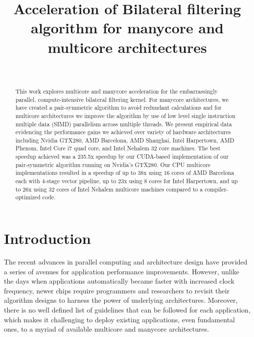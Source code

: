 \documentclass{IEEEtran}
\begin{document}
\title{Acceleration of Bilateral filtering algorithm for manycore and multicore architectures}
\author{\\
}
\maketitle
\begin{abstract}
This work explores multicore and manycore acceleration for the embarrassingly parallel, compute-intensive bilateral filtering kernel. For manycore architectures, we have created a pair-symmetric algorithm to avoid redundant calculations and for multicore architectures we improve the algorithm by use of low level single instruction multiple data (SIMD) parallelism across multiple threads. We present empirical data evidencing the performance gains we achieved over variety of hardware architectures including Nvidia GTX280, AMD Barcelona, AMD Shanghai, Intel Harpertown, AMD Phenom, Intel Core i7 quad core, and Intel Nehalem 32 core machines. The best speedup achieved was a 235.5x speedup by our CUDA-based implementation of our pair-symmetric algorithm running on Nvidia's GTX280. Our CPU multicore implementations resulted in a speedup of up to 38x using 16 cores of AMD Barcelona each with 4-stage vector pipeline, up to 23x using 8 cores for Intel Harpertown, and up to 26x using 32 cores of Intel Nehalem multicore machines compared to a compiler-optimized code.
\end{abstract}
\IEEEpeerreviewmaketitle
\section{Introduction}
\label{sec:intro} The recent advances in parallel computing and architecture design have provided a series of avenues for application performance improvements. However, unlike the days when applications automatically became faster with increased clock frequency, newer chips require programmers and researchers to revisit their algorithm designs to harness the power of underlying architectures. Moreover, there is no well defined list of guidelines that can be followed for each application, which makes it challenging to deploy existing applications, even fundamental ones, to a myriad of available multicore and manycore architectures.
\end{document}
